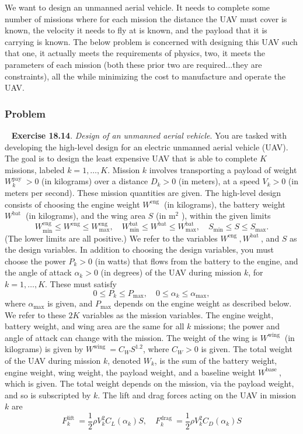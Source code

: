 \documentclass[12pt,reqno]{article}
\theoremstyle{definition}
\numberwithin{equation}{section}
\begin{document}
\noindent We want to design an unmanned aerial vehicle. It needs to complete some number of missions
where for each mission the distance the UAV must cover is known, the velocity it needs to fly at
is known, and the payload that it is carrying is known. The below problem is concerned with
designing this UAV such that one, it actually meets the requirements of physics, two, it meets
the parameters of each mission (both these prior two are required...they are constraints), all the
while minimizing the cost to manufacture and operate the UAV.

\subsubsection*{Problem}
    \noindent~\cite{EE364a-extra} \textbf{Exercise 18.14}. \textit{Design of an unmanned aerial vehicle}.
    You are tasked with developing the high-level design for an electric unmanned aerial vehicle (UAV). The goal is to design the least expensive UAV that is able to complete $K$ missions, labeled $k=1, \ldots, K$. Mission $k$ involves transporting a payload of weight $W_k^{\text {pay }}>0$ (in kilograms) over a distance $D_k>0$ (in meters), at a speed $V_k>0$ (in meters per second). These mission quantities are given.
    The high-level design consists of choosing the engine weight $W^{\text {eng }}$ (in kilograms), the battery weight $W^{\text {bat }}$ (in kilograms), and the wing area $S$ (in $\mathrm{m}^2$ ), within the given limits
    \[
    W_{\min }^{\mathrm{eng}} \leq W^{\mathrm{eng}} \leq W_{\max }^{\mathrm{eng}}, \quad W_{\min }^{\mathrm{bat}} \leq W^{\mathrm{bat}} \leq W_{\max }^{\mathrm{bat}}, \quad S_{\min } \leq S \leq S_{\max } .
    \]
    (The lower limits are all positive.) We refer to the variables $W^{\text {eng }}, W^{\text {bat }}$, and $S$ as the design variables.
    In addition to choosing the design variables, you must choose the power $P_k>0$ (in watts) that flows from the battery to the engine, and the angle of attack $\alpha_k>0$ (in degrees) of the UAV during mission $k$, for $k=1, \ldots, K$. These must satisfy
    \[
    0 \leq P_k \leq P_{\max }, \quad 0 \leq \alpha_k \leq \alpha_{\max },
    \]
    where $\alpha_{\max }$ is given, and $P_{\max }$ depends on the engine weight as described below. We refer to these $2 K$ variables as the mission variables. The engine weight, battery weight, and wing area are the same for all $k$ missions; the power and angle of attack can change with the mission.
    The weight of the wing is $W^{\text {wing }}$ (in kilograms) is given by $W^{\text {wing }}=C_W S^{1.2}$, where $C_W>0$ is given. The total weight of the UAV during mission $k$, denoted $W_k$, is the sum of the battery weight, engine weight, wing weight, the payload weight, and a baseline weight $W^{\text {base }}$, which is given. The total weight depends on the mission, via the payload weight, and so is subscripted by $k$.
    The lift and drag forces acting on the UAV in mission $k$ are
    \[
    F_k^{\text {lift }}=\frac{1}{2} \rho V_k^2 C_L\left(\alpha_k\right) S, \quad F_k^{\text {drag }}=\frac{1}{2} \rho V_k^2 C_D\left(\alpha_k\right) S
    \]
\end{document}

